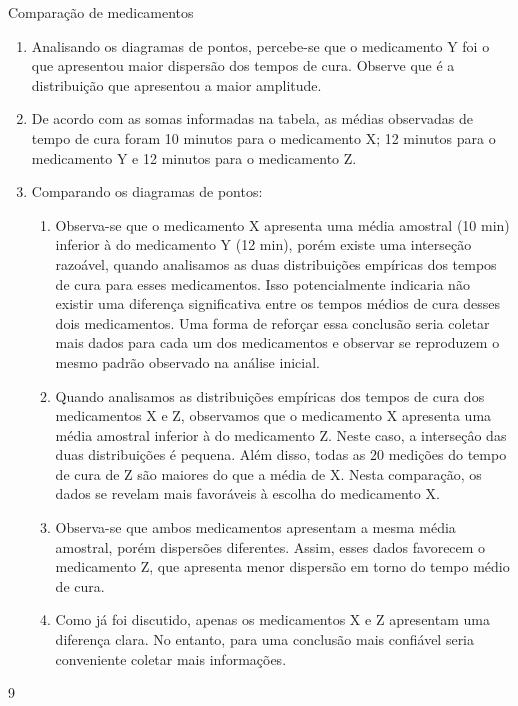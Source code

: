 \begin{answer}{Comparação de medicamentos}
{\begin{enumerate}
\begin{tikzpicture}[x=10,y=10]
   \end{tikzpicture}

\item Analisando os diagramas de pontos, percebe-se que o medicamento Y foi o que apresentou maior dispersão dos tempos de cura. Observe que é a distribuição que apresentou a maior amplitude.

\item De acordo com as somas informadas na tabela, as médias observadas de tempo de cura foram 10 minutos para o medicamento X; 12 minutos para o medicamento Y e 12 minutos para o medicamento Z.

\item Comparando os diagramas de pontos:
\begin{enumerate}
\item Observa-se que o medicamento X apresenta uma média amostral (10 min) inferior à do medicamento Y (12 min), porém existe uma interseção razoável, quando analisamos as duas distribuições empíricas dos tempos de cura para esses medicamentos. Isso potencialmente indicaria não existir uma diferença significativa entre os tempos médios de cura desses dois medicamentos. Uma forma de reforçar essa conclusão seria coletar mais dados para cada um dos medicamentos e observar se reproduzem o mesmo padrão observado na análise inicial.

\item Quando analisamos as distribuições empíricas dos tempos de cura dos medicamentos X e Z, observamos que o medicamento X apresenta uma média amostral inferior à do medicamento Z. Neste caso, a interseçâo das duas distribuições é pequena. Além disso, todas as 20 medições do tempo de cura de Z são maiores do que a média de X. Nesta comparação, os dados se revelam mais favoráveis à escolha do medicamento X.

\item Observa-se que ambos medicamentos apresentam a mesma média amostral, porém dispersões diferentes. Assim, esses dados favorecem o medicamento Z, que apresenta menor dispersão em torno do tempo médio de cura.

\item Como já foi discutido, apenas os medicamentos X e Z apresentam uma diferença clara. No entanto, para uma conclusão mais confiável seria conveniente coletar mais informações.
\end{enumerate}
\end{enumerate}
}{9}
\end{answer}
